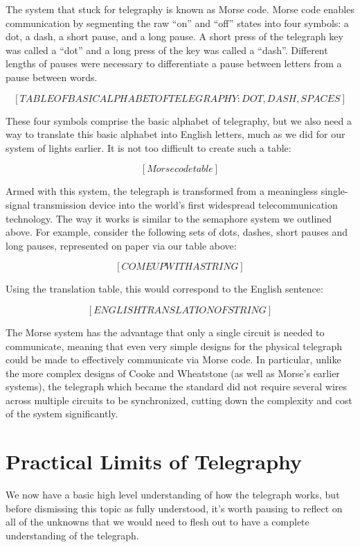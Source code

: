 \documentclass{book}
\begin{document}
The system that stuck for telegraphy is known as Morse code. Morse code enables communication by segmenting the raw ``on'' and ``off'' states into four symbols: a dot, a dash, a short pause, and a long pause. A short press of the telegraph key was called a ``dot'' and a long press of the key was called a ``dash''. Different lengths of pauses were necessary to differentiate a pause between letters from a pause between words.

\[ [TABLE OF BASIC ALPHABET OF TELEGRAPHY: DOT, DASH, SPACES] \]

These four symbols comprise the basic alphabet of telegraphy, but we also need a way to translate this basic alphabet into English letters, much as we did for our system of lights earlier. It is not too difficult to create such a table:

\[ [Morse code table] \]

Armed with this system, the telegraph is transformed from a meaningless single-signal transmission device into the world's first widespread telecommunication technology. The way it works is similar to the semaphore system we outlined above. For example, consider the following sets of dots, dashes, short pauses and long pauses, represented on paper via our table above:

\[ [COME UP WITH A STRING] \]

Using the translation table, this would correspond to the English sentence:

\[ [ENGLISH TRANSLATION OF STRING] \]

The Morse system has the advantage that only a single circuit is needed to communicate, meaning that even very simple designs for the physical telegraph could be made to effectively communicate via Morse code. In particular, unlike the more complex designs of Cooke and Wheatstone (as well as Morse's earlier systems), the telegraph which became the standard did not require several wires across multiple circuits to be synchronized, cutting down the complexity and cost of the system significantly.

\section{Practical Limits of Telegraphy}

We now have a basic high level understanding of how the telegraph works, but before dismissing this topic as fully understood, it's worth pausing to reflect on all of the unknowns that we would need to flesh out to have a complete understanding of the telegraph.
\end{document}
